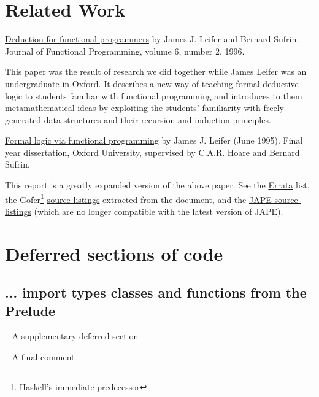 \documentclass[11pt]{article}
\begin{document}
\section{Related Work}

\href{http://pauillac.inria.fr/~leifer/articles/logic/LogicPearl.dvi.gz}
{Deduction for functional programmers} by James J. Leifer and Bernard Sufrin.
Journal of Functional Programming, volume 6, number 2, 1996.

This paper was the result of research we did together while James Leifer was an undergraduate 
in Oxford. It describes a new way of
teaching formal deductive logic to students familiar with functional
programming and introduces to them metamathematical ideas by
exploiting the students' familiarity with freely-generated
data-structures and their recursion and induction principles.

\href{http://pauillac.inria.fr/~leifer/articles/logic/LogicviaFP.300.ps.gz}
{Formal logic via functional programming} by James J. Leifer (June 1995).
Final year dissertation, Oxford University, supervised by
C.A.R. Hoare and Bernard Sufrin.

This report is a greatly expanded version of the above paper. See
the
\href{http://pauillac.inria.fr/~leifer/articles/logic/LogicviaFP.Errata}
{Errata} list, the Gofer\footnote{Haskell's immediate predecessor}
\href{http://pauillac.inria.fr/~leifer/articles/logic/LogicviaFP.gs}
{source-listings} extracted from the document, and the
\href{http://pauillac.inria.fr/~leifer/articles/logic/LogicviaFP.j} {JAPE
source-listings} (which are no longer compatible with the
latest version of JAPE).

\appendix
\section{Deferred sections of code}

\subsection{... import types classes and functions from the Prelude}

\begin{code}    
 -- A supplementary deferred section
 
\end{code}

\begin{code}     
 -- A final comment
 
\end{code}
\end{document}
